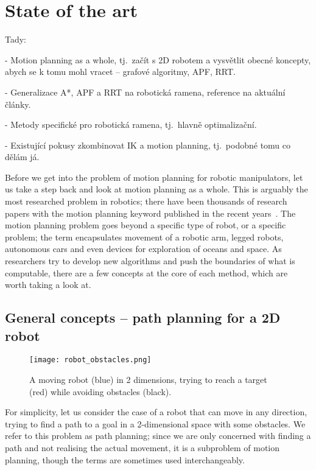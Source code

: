 \chapter{State of the art}\label{SotA}

Tady:

- Motion planning as a whole, tj.\ začít s 2D robotem a vysvětlit obecné koncepty, abych se k tomu mohl vracet -- grafové algoritmy, APF, RRT.

- Generalizace A*, APF a RRT na robotická ramena, reference na aktuální články.

- Metody specifické pro robotická ramena, tj.\ hlavně optimalizační.

- Existující pokusy zkombinovat IK a motion planning, tj.\ podobné tomu co dělám já.

Before we get into the problem of motion planning for robotic manipulators, let us take a step back and look at motion planning as a whole. This is arguably the most researched problem in robotics; there have been thousands of research papers with the motion planning keyword published in the recent years~\cite{RASreview}. The motion planning problem goes beyond a specific type of robot, or a specific problem; the term encapsulates movement of a robotic arm, legged robots, autonomous cars and even devices for exploration of oceans and space.
As researchers try to develop new algorithms and push the boundaries of what is computable, there are a few concepts at the core of each method, which are worth taking a look at.

\section{General concepts -- path planning for a 2D robot}

\begin{wrapfigure}{r}{0.33\textwidth}
    \centering
    \texttt{[image: robot\_obstacles.png]}
  \caption{A moving robot (blue) in 2 dimensions, trying to reach a target (red) while avoiding obstacles (black).}\label{fig:bot}
\end{wrapfigure}

For simplicity, let us consider the case of a robot that can move in any direction, trying to find a path to a goal in a 2-dimensional space with some obstacles. We refer to this problem as path planning; since we are only concerned with finding a path and not realising the actual movement, it is a subproblem of motion planning, though the terms are sometimes used interchangeably.

